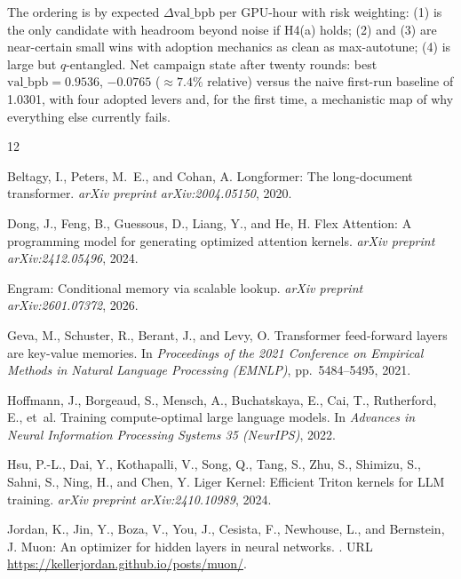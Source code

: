 \documentclass{article}
\newcommand{\valbpb}{\mathrm{val\_bpb}}
\begin{document}
The ordering is by expected $\Delta\valbpb$ per GPU-hour with risk weighting: (1) is the only candidate with headroom beyond noise if H4(a) holds; (2) and (3) are near-certain small wins with adoption mechanics as clean as max-autotune; (4) is large but $q$-entangled. Net campaign state after twenty rounds: best $\valbpb = 0.9536$, $-0.0765$ ($\approx 7.4\%$ relative) versus the naive first-run baseline of 1.0301, with four adopted levers and, for the first time, a mechanistic map of why everything else currently fails.



\begin{thebibliography}{12}

Beltagy, I., Peters, M.~E., and Cohan, A.
\newblock Longformer: The long-document transformer.
\newblock \emph{arXiv preprint arXiv:2004.05150}, 2020.

Dong, J., Feng, B., Guessous, D., Liang, Y., and He, H.
\newblock Flex Attention: A programming model for generating optimized attention kernels.
\newblock \emph{arXiv preprint arXiv:2412.05496}, 2024.

Engram: Conditional memory via scalable lookup.
\newblock \emph{arXiv preprint arXiv:2601.07372}, 2026.

Geva, M., Schuster, R., Berant, J., and Levy, O.
\newblock Transformer feed-forward layers are key-value memories.
\newblock In \emph{Proceedings of the 2021 Conference on Empirical Methods in Natural Language Processing (EMNLP)}, pp.\ 5484--5495, 2021.

Hoffmann, J., Borgeaud, S., Mensch, A., Buchatskaya, E., Cai, T., Rutherford, E., et~al.
\newblock Training compute-optimal large language models.
\newblock In \emph{Advances in Neural Information Processing Systems 35 (NeurIPS)}, 2022.

Hsu, P.-L., Dai, Y., Kothapalli, V., Song, Q., Tang, S., Zhu, S., Shimizu, S., Sahni, S., Ning, H., and Chen, Y.
\newblock Liger Kernel: Efficient Triton kernels for LLM training.
\newblock \emph{arXiv preprint arXiv:2410.10989}, 2024.

Jordan, K., Jin, Y., Boza, V., You, J., Cesista, F., Newhouse, L., and Bernstein, J.
\newblock Muon: An optimizer for hidden layers in neural networks.
.
\newblock URL \url{https://kellerjordan.github.io/posts/muon/}.


\end{thebibliography}
\end{document}
